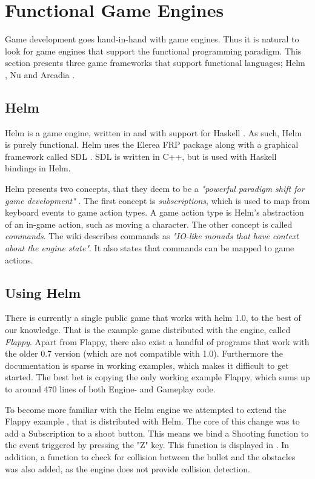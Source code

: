 \section{Functional Game Engines}
Game development goes hand-in-hand with game engines. Thus it is natural to look for game engines that support the functional programming paradigm. This section presents three game frameworks that support functional languages; Helm \cite{helm:github}, Nu \cite{nu:github} and Arcadia \cite{arcadia:github}.

\subsection{Helm}
Helm is a game engine, written in and with support for Haskell \cite{helm:github,helm:wiki}. As such, Helm is purely functional. Helm uses the Elerea \ac{FRP} package along with a graphical framework called \ac{SDL} \cite{libsdl:about}. \ac{SDL} is written in C++, but is used with Haskell bindings in Helm.

Helm presents two concepts, that they deem to be a \textit{"powerful paradigm shift for game development"} \cite{helm:wiki}. The first concept is \textit{subscriptions}, which is used to map from keyboard events to game action types. A game action type is Helm's abstraction of an in-game action, such as moving a character. The other concept is called \textit{commands}. The wiki describes commands as \textit{"IO-like monads that have context about the engine state"}. It also states that commands can be mapped to game actions.

\subsection{Using Helm}
There is currently a single public game that works with helm 1.0, to the best of our knowledge. That is the example game distributed with the engine, called \textit{Flappy}. Apart from Flappy, there also exist a handful of programs that work with the older 0.7 version (which are not compatible with 1.0). Furthermore the documentation is sparse in working examples, which makes it difficult to get started. The best bet is copying the only working example Flappy, which sums up to around 470 lines of both Engine- and Gameplay code.

To become more familiar with the Helm engine we attempted to extend the Flappy example \cite{hs-helm-flabby-shooter:github}, that is distributed with Helm. The core of this change was to add a Subscription to a shoot button. This means we bind a Shooting function to the event triggered by pressing the "Z" key. This function is displayed in . In addition, a function to check for collision between the bullet and the obstacles was also added, as the engine does not provide collision detection.


